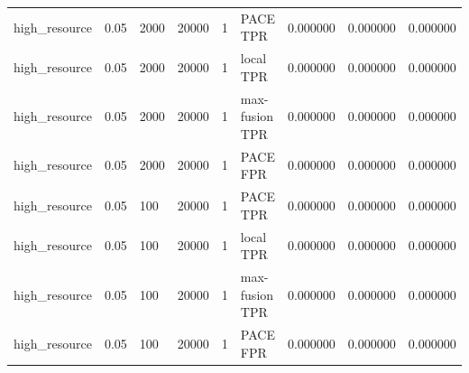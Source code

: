 \begin{tabular}{lllllllll}
high\_resource & 0.05 & 2000 & 20000 & 1 & PACE TPR & 0.000000 & 0.000000 & 0.000000 \\
high\_resource & 0.05 & 2000 & 20000 & 1 & local TPR & 0.000000 & 0.000000 & 0.000000 \\
high\_resource & 0.05 & 2000 & 20000 & 1 & max-fusion TPR & 0.000000 & 0.000000 & 0.000000 \\
high\_resource & 0.05 & 2000 & 20000 & 1 & PACE FPR & 0.000000 & 0.000000 & 0.000000 \\
high\_resource & 0.05 & 100 & 20000 & 1 & PACE TPR & 0.000000 & 0.000000 & 0.000000 \\
high\_resource & 0.05 & 100 & 20000 & 1 & local TPR & 0.000000 & 0.000000 & 0.000000 \\
high\_resource & 0.05 & 100 & 20000 & 1 & max-fusion TPR & 0.000000 & 0.000000 & 0.000000 \\
high\_resource & 0.05 & 100 & 20000 & 1 & PACE FPR & 0.000000 & 0.000000 & 0.000000 \\
\bottomrule
\end{tabular}
